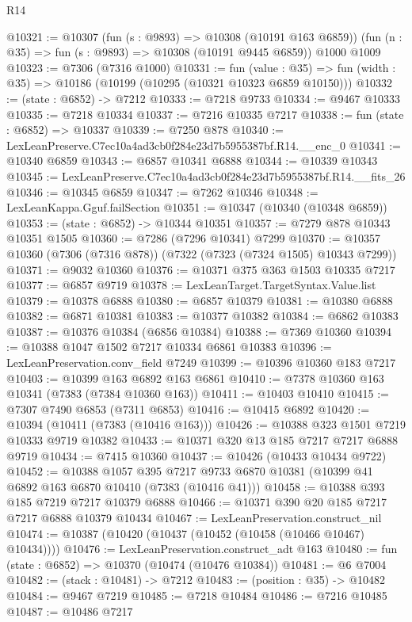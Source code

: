 \begin{lexlean}{R14}
\begin{coremodule}
@10321 := @10307
    (fun (s : @9893) => @10308 (@10191 @163 @6859))
    (fun (n : @35) => fun (s : @9893) => @10308 (@10191 @9445 @6859))
    @1000
    @1009
@10323 := @7306 (@7316 @1000)
@10331 := fun (value : @35) =>
  fun (width : @35) => @10186 (@10199 (@10295 (@10321 @10323 @6859 @10150)))
@10332 := (state : @6852) -> @7212
@10333 := @7218 @9733
@10334 := @9467 @10333
@10335 := @7218 @10334
@10337 := @7216 @10335 @7217
@10338 := fun (state : @6852) => @10337
@10339 := @7250 @878
@10340 := LexLeanPreserve.C7ec10a4ad3cb0f284e23d7b5955387bf.R14.__enc_0
@10341 := @10340 @6859
@10343 := @6857 @10341 @6888
@10344 := @10339 @10343
@10345 := LexLeanPreserve.C7ec10a4ad3cb0f284e23d7b5955387bf.R14.__fits_26
@10346 := @10345 @6859
@10347 := @7262 @10346
@10348 := LexLeanKappa.Gguf.failSection
@10351 := @10347 (@10340 (@10348 @6859))
@10353 := (state : @6852) -> @10344 @10351
@10357 := @7279 @878 @10343 @10351 @1505
@10360 := @7286 (@7296 @10341) @7299
@10370 := @10357 @10360 (@7306 (@7316 @878)) (@7322 (@7323 (@7324 @1505) @10343 @7299))
@10371 := @9032 @10360
@10376 := @10371 @375 @363 @1503 @10335 @7217
@10377 := @6857 @9719
@10378 := LexLeanTarget.TargetSyntax.Value.list
@10379 := @10378 @6888
@10380 := @6857 @10379
@10381 := @10380 @6888
@10382 := @6871 @10381
@10383 := @10377 @10382
@10384 := @6862 @10383
@10387 := @10376 @10384 (@6856 @10384)
@10388 := @7369 @10360
@10394 := @10388 @1047 @1502 @7217 @10334 @6861 @10383
@10396 := LexLeanPreservation.conv_field @7249
@10399 := @10396 @10360 @183 @7217
@10403 := @10399 @163 @6892 @163 @6861
@10410 := @7378 @10360 @163 @10341 (@7383 (@7384 @10360 @163))
@10411 := @10403 @10410
@10415 := @7307 @7490 @6853 (@7311 @6853)
@10416 := @10415 @6892
@10420 := @10394 (@10411 (@7383 (@10416 @163)))
@10426 := @10388 @323 @1501 @7219 @10333 @9719 @10382
@10433 := @10371 @320 @13 @185 @7217 @7217 @6888 @9719
@10434 := @7415 @10360
@10437 := @10426 (@10433 @10434 @9722)
@10452 := @10388
    @1057
    @395
    @7217
    @9733
    @6870
    @10381
    (@10399 @41 @6892 @163 @6870 @10410 (@7383 (@10416 @41)))
@10458 := @10388 @393 @185 @7219 @7217 @10379 @6888
@10466 := @10371 @390 @20 @185 @7217 @7217 @6888 @10379 @10434
@10467 := LexLeanPreservation.construct_nil
@10474 := @10387 (@10420 (@10437 (@10452 (@10458 (@10466 @10467) @10434))))
@10476 := LexLeanPreservation.construct_adt @163
@10480 := fun (state : @6852) => @10370 (@10474 (@10476 @10384))
@10481 := @6 @7004
@10482 := (stack : @10481) -> @7212
@10483 := (position : @35) -> @10482
@10484 := @9467 @7219
@10485 := @7218 @10484
@10486 := @7216 @10485
@10487 := @10486 @7217

\end{coremodule}
\end{lexlean}
